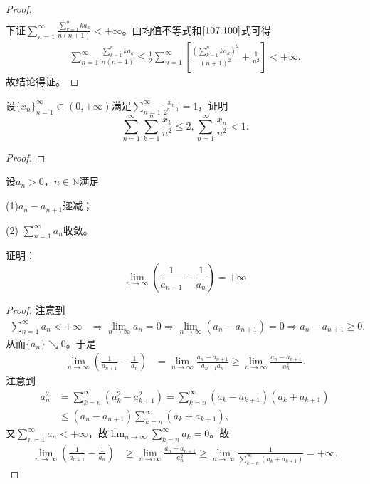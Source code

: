 \documentclass[../../main.tex]{subfiles}
\begin{document}
\begin{proof}
\begin{align*}
\end{align*}
下证\(\sum_{n=1}^{\infty}{\frac{\sum\limits_{k=1}^n{ka_k}}{n\left( n+1 \right)}}<+\infty\)。由均值不等式和\(\eqref{107.100}\)式可得
\begin{align*}
\sum_{n=1}^{\infty}{\frac{\sum\limits_{k=1}^n{ka_k}}{n\left( n+1 \right)}}\leqslant \frac{1}{2}\sum_{n=1}^{\infty}{\left[ \frac{\left( \sum\limits_{k=1}^n{ka_k} \right) ^2}{\left( n+1 \right) ^2}+\frac{1}{n^2} \right]}<+\infty .
\end{align*}
故结论得证。
\end{proof}

\begin{example}
设$\{x_n\}_{n = 1}^{\infty} \subset (0,+\infty)$满足$\sum_{n = 1}^{\infty} \frac{x_n}{2^{n - 1}} = 1$，证明
\[
\sum_{n = 1}^{\infty} \sum_{k = 1}^n \frac{x_k}{n^2} \leqslant 2, \sum_{n = 1}^{\infty} \frac{x_n}{n^2} < 1.
\]
\end{example}
\begin{proof}

\end{proof}

\begin{example}
设$a_n > 0$，$n \in \mathbb{N}$满足

(1)$a_n - a_{n + 1}$递减；

(2) $\sum_{n = 1}^{\infty} a_n$收敛。

证明：
\[
\lim_{n \to \infty} \left( \frac{1}{a_{n + 1}} - \frac{1}{a_n} \right) = +\infty
\]
\end{example}
\begin{proof}
注意到
\begin{align*}
\sum_{n=1}^{\infty}{a_n}<+\infty &\Longrightarrow \lim_{n\rightarrow \infty}a_n=0\Longrightarrow \lim_{n\rightarrow \infty}\left( a_n-a_{n+1} \right) =0\Longrightarrow a_n-a_{n+1}\geqslant 0.
\end{align*}
从而$\{ a_n \} \searrow 0$。于是
\begin{align*}
\lim_{n\rightarrow \infty}\left( \frac{1}{a_{n+1}}-\frac{1}{a_n} \right) &=\lim_{n\rightarrow \infty}\frac{a_n-a_{n+1}}{a_{n+1}a_n}\geqslant \lim_{n\rightarrow \infty}\frac{a_n-a_{n+1}}{a_{n}^{2}}.
\end{align*}
注意到
\begin{align*}
a_{n}^{2}&=\sum_{k=n}^{\infty}{\left( a_{k}^{2}-a_{k+1}^{2} \right)}=\sum_{k=n}^{\infty}{\left( a_k-a_{k+1} \right) \left( a_k+a_{k+1} \right)} \\
&\leqslant \left( a_n-a_{n+1} \right) \sum_{k=n}^{\infty}{\left( a_k+a_{k+1} \right)},
\end{align*}
又$\sum_{n=1}^{\infty}{a_n}<+\infty$，故$\lim_{n\rightarrow \infty}\sum_{k=n}^{\infty}{a_k}=0$。故
\begin{align*}
\lim_{n\rightarrow \infty}\left( \frac{1}{a_{n+1}}-\frac{1}{a_n} \right) &\geqslant \lim_{n\rightarrow \infty}\frac{a_n-a_{n+1}}{a_{n}^{2}}\geqslant \lim_{n\rightarrow \infty}\frac{1}{\sum\limits_{k=n}^{\infty}{\left( a_k+a_{k+1} \right)}}=+\infty .
\end{align*}
\end{proof}
\end{document}

